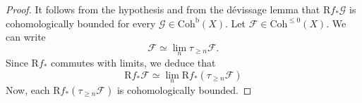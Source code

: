 \documentclass[12pt,a4paper,reqno]{amsart}
\theoremstyle{plain}
\theoremstyle{definition}
\theoremstyle{remark}
\numberwithin{equation}{section}
\begin{document}
\begin{proof}
	It follows from the hypothesis and from the d\'evissage lemma \cite[Lemma 5.10]{Porta_Yu_Higher_analytic_stacks_2014} that ${\mathrm R} f_* {\mathcal G}$ is cohomologically bounded for every ${\mathcal G} \in {\mathrm{Coh}^{\mathrm{b}}}(X)$.
	Let ${\mathcal F} \in {\mathrm{Coh}}^{\le 0}(X)$.
	We can write
	\[ {\mathcal F} \simeq \lim_n \tau_{\ge n} {\mathcal F} . \]
	Since ${\mathrm R} f_*$ commutes with limits, we deduce that
	\[ {\mathrm R} f_* {\mathcal F} \simeq \lim_n {\mathrm R} f_*( \tau_{\ge n} {\mathcal F} ) \]
	Now, each ${\mathrm R} f_*(\tau_{\ge n} {\mathcal F})$ is cohomologically bounded.
\end{proof}

\fi



\end{document}
